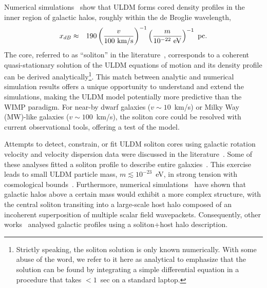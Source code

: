\documentclass[aps,prd,floats,superscriptaddress,showpacs,nofootinbib,twocolumn,preprintnumbers]{revtex4-1}%
\def\be{\begin{eqnarray}}
\def\ee{\end{eqnarray}}
\begin{document}
Numerical simulations~\cite{Schive:2014dra,Schive:2014hza,Mocz:2017wlg,Veltmaat:2016rxo,Schwabe:2016rze} show that ULDM forms cored density profiles in the inner region of galactic halos, roughly within the de Broglie wavelength, 
%
\be\label{eq:ldB}x_
{dB}&\approx&190\left(\frac{v}{100~{\rm km/s}}\right)^{-1}\left(\frac{m}{10^{-22}~{\rm eV}}\right)^{-1}~{\rm pc}.\ee
%
The core, referred to as ``soliton'' in the
literature~\cite{Chavanis:2011zi,Chavanis:2011zm,Marsh:2015wka,Chen:2016unw},
corresponds to a coherent quasi-stationary solution of the ULDM
equations of motion and its density profile can be derived
analytically\footnote{Strictly speaking, the soliton solution is only known numerically. With some abuse of the word, we refer to it here as analytical to emphasize that the solution can be found by integrating a simple differential equation in a procedure that takes $<1$~sec on a standard laptop.}. This match between analytic and numerical simulation results offers
a unique opportunity to understand and extend the simulations,
making the ULDM model potentially more predictive than the WIMP
paradigm.  
For near-by dwarf galaxies ($v\sim10$~km/s) or Milky Way (MW)-like galaxies
($v\sim100$~km/s), the soliton core could be resolved with current
observational tools, offering a test of the model.  

Attempts to detect, constrain, or fit ULDM soliton cores using galactic rotation velocity and velocity dispersion data were discussed in the literature~\cite{Schive:2014dra,Schive:2014hza,Marsh:2015wka,Calabrese:2016hmp,Gonzales-Morales:2016mkl,Robles:2012uy,Bernal:2017oih,Lesgourgues:2002hk,Arbey:2001qi}. 
Some of these analyses fitted a soliton profile to describe entire
galaxies~\cite{Lesgourgues:2002hk,Arbey:2001qi,Calabrese:2016hmp}. This
exercise leads to small ULDM particle mass, $m\lesssim10^{-23}$~eV, in
strong tension with cosmological
bounds~\cite{Bozek:2014uqa,Armengaud:2017nkf,Irsic:2017yje,Zhang:2017chj,Kobayashi:2017jcf}. Furthermore,
numerical
simulations~\cite{Schive:2014dra,Schive:2014hza,Mocz:2017wlg,Veltmaat:2016rxo,Schwabe:2016rze}
have shown that galactic halos above a certain mass
would exhibit a more complex structure, with the central soliton
transiting into a large-scale host halo composed of an incoherent
superposition of multiple scalar field wavepackets.
Consequently, other
works~\cite{Marsh:2015wka,Gonzales-Morales:2016mkl,Robles:2012uy,Bernal:2017oih}
analysed galactic profiles using a soliton+host halo description.  
%
\end{document}
